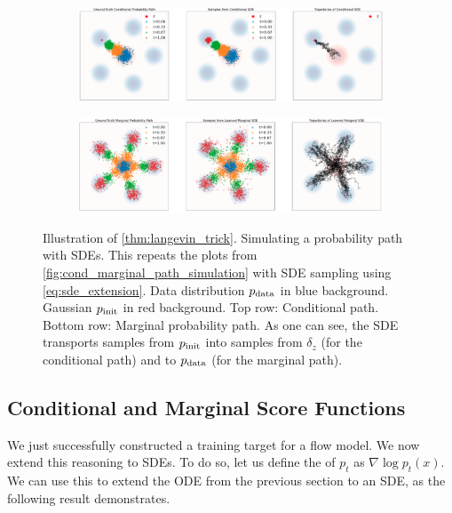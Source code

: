 \begin{figure}[t!]
\centering
   \begin{subfigure}[b]{\textwidth}
   \centering
   \includegraphics[width=\textwidth]{figures/conditional_sde.png}
   \label{fig:Ng1} 
\end{subfigure}
\begin{subfigure}[b]{\textwidth}
    \centering
   \includegraphics[width=\textwidth]{figures/marginal_sde.png}
   \label{fig:Ng2}
\end{subfigure}
\caption{\label{fig:thm_sde_extension}Illustration of \cref{thm:langevin_trick}. Simulating a probability path with SDEs. This repeats the plots from \cref{fig:cond_marginal_path_simulation} with SDE sampling using \cref{eq:sde_extension}. Data distribution $p_{\rm{data}}$ in blue background. Gaussian $p_{\rm{init}}$ in red background. Top row: Conditional path. Bottom row: Marginal probability path. As one can see, the SDE transports samples from $p_{\rm{init}}$ into samples from $\delta_{z}$ (for the conditional path) and to $p_{\rm{data}}$ (for the marginal path).}
\end{figure}

\subsection{Conditional and Marginal Score Functions}

We just successfully constructed a training target for a flow model. We now extend this reasoning to SDEs. To do so, let us define the  of $p_t$ as $\nabla\log p_t(x)$. We can use this to extend the ODE from the previous section to an SDE, as the following result demonstrates.

